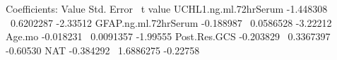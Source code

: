 \documentclass[12pt]{article}
\newcommand{\9}{\\[9pt]}
\begin{document}
\begin{landscape}
\begin{Large}
{\begin{VM}
Coefficients:
                          Value Std. Error  t value
UCHL1.ng.ml.72hrSerum -1.448308  0.6202287 -2.33512
GFAP.ng.ml.72hrSerum  -0.188987  0.0586528 -3.22212
Age.mo                -0.018231  0.0091357 -1.99555
Post.Res.GCS          -0.203829  0.3367397 -0.60530
NAT                   -0.384292  1.6886275 -0.22758
\end{VM}




} %
\end{Large}\end{landscape}
\end{document}
